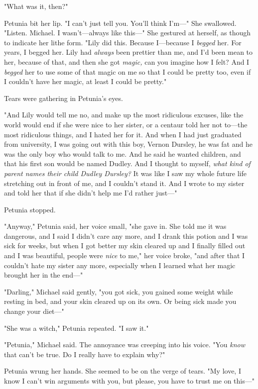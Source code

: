 "What was it, then?"

Petunia bit her lip. "I can't just tell you. You'll think I'm\mbox{---}" She
swallowed. "Listen. Michael. I wasn't---always like this\mbox{---}" She gestured at
herself, as though to indicate her lithe form. "Lily did this. Because
I---because I \emph{begged} her. For years, I begged her. Lily had
\emph{always} been prettier than me, and I'd{\el} been mean to her, because
of that, and then she got \emph{magic,} can you imagine how I felt? And I
\emph{begged} her to use some of that magic on me so that I could be pretty
too, even if I couldn't have her magic, at least I could be pretty."

Tears were gathering in Petunia's eyes.

"And Lily would tell me no, and make up the most ridiculous excuses, like the
world would end if she were nice to her sister, or a centaur told her not
to---the most ridiculous things, and I hated her for it. And when I had just
graduated from university, I was going out with this boy, Vernon Dursley, he
was fat and he was the only boy who would talk to me. And he said he wanted
children, and that his first son would be named Dudley. And I thought to
myself, \emph{what kind of parent names their child Dudley Dursley?} It was
like I saw my whole future life stretching out in front of me, and I couldn't
stand it. And I wrote to my sister and told her that if she didn't help me I'd
rather just\mbox{---}"

Petunia stopped.

"Anyway," Petunia said, her voice small, "she gave in. She told me it was
dangerous, and I said I didn't care any more, and I drank this potion and I was
sick for weeks, but when I got better my skin cleared up and I finally filled
out and{\el} I was beautiful, people were \emph{nice} to me," her voice
broke, "and after that I couldn't hate my sister any more, especially when I
learned what her magic brought her in the end\mbox{---}"

"Darling," Michael said gently, "you got sick, you gained some weight while
resting in bed, and your skin cleared up on its own. Or being sick made you
change your diet\mbox{---}"

"She was a witch," Petunia repeated. "I saw it."

"Petunia," Michael said. The annoyance was creeping into his voice. "You
\emph{know} that can't be true. Do I really have to explain why?"

Petunia wrung her hands. She seemed to be on the verge of tears. "My love, I
know I can't win arguments with you, but please, you have to trust me on
this\mbox{---}"

